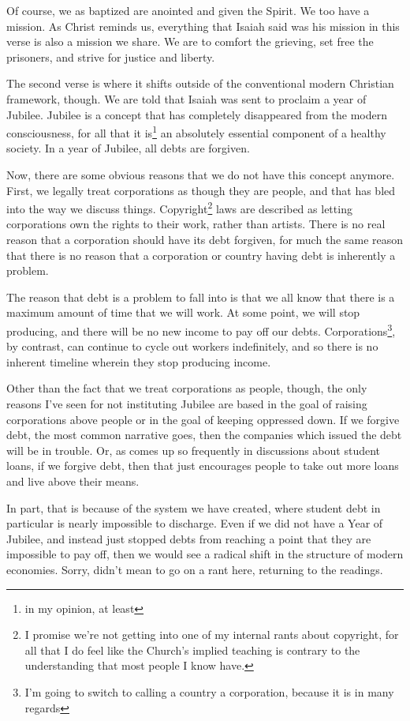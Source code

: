 \documentclass[12pt]{article}[titlepage]
\newcommand{\1}{\={a}}
\newcommand{\2}{\={e}}
\newcommand{\3}{\={\i}}
\newcommand{\4}{\=o}
\newcommand{\5}{\=u}
\newcommand{\6}{\={A}}
\renewcommand{\,}{\textsuperscript{,}}
\begin{document}
Of course, we as baptized are anointed and given the Spirit.
We too have a mission.
As Christ reminds us, everything that Isaiah said was his mission in this verse is also a mission we share.
We are to comfort the grieving, set free the prisoners, and strive for justice and liberty.

The second verse is where it shifts outside of the conventional modern Christian framework, though.
We are told that Isaiah was sent to proclaim a year of Jubilee.
Jubilee is a concept that has completely disappeared from the modern consciousness, for all that it is\footnote{in my opinion, at least} an absolutely essential component of a healthy society.
In a year of Jubilee, all debts are forgiven.

Now, there are some obvious reasons that we do not have this concept anymore.
First, we legally treat corporations as though they are people, and that has bled into the way we discuss things.
Copyright\footnote{I promise we're not getting into one of my internal rants about copyright, for all that I do feel like the Church's implied teaching is contrary to the understanding that most people I know have.} laws are described as letting corporations own the rights to their work, rather than artists.
There is no real reason that a corporation should have its debt forgiven, for much the same reason that there is no reason that a corporation or country having debt is inherently a problem.

The reason that debt is a problem to fall into is that we all know that there is a maximum amount of time that we will work.
At some point, we will stop producing, and there will be no new income to pay off our debts. 
Corporations\footnote{I'm going to switch to calling a country a corporation, because it is in many regards}, by contrast, can continue to cycle out workers indefinitely, and so there is no inherent timeline wherein they stop producing income.

Other than the fact that we treat corporations as people, though, the only reasons I've seen for not instituting Jubilee are based in the goal of raising corporations above people or in the goal of keeping oppressed down.
If we forgive debt, the most common narrative goes, then the companies which issued the debt will be in trouble.
Or, as comes up so frequently in discussions about student loans, if we forgive debt, then that just encourages people to take out more loans and live above their means.

In part, that is because of the system we have created, where student debt in particular is nearly impossible to discharge.
Even if we did not have a Year of Jubilee, and instead just stopped debts from reaching a point that they are impossible to pay off, then we would see a radical shift in the structure of modern economies.
Sorry, didn't mean to go on a rant here, returning to the readings.
\end{document}
